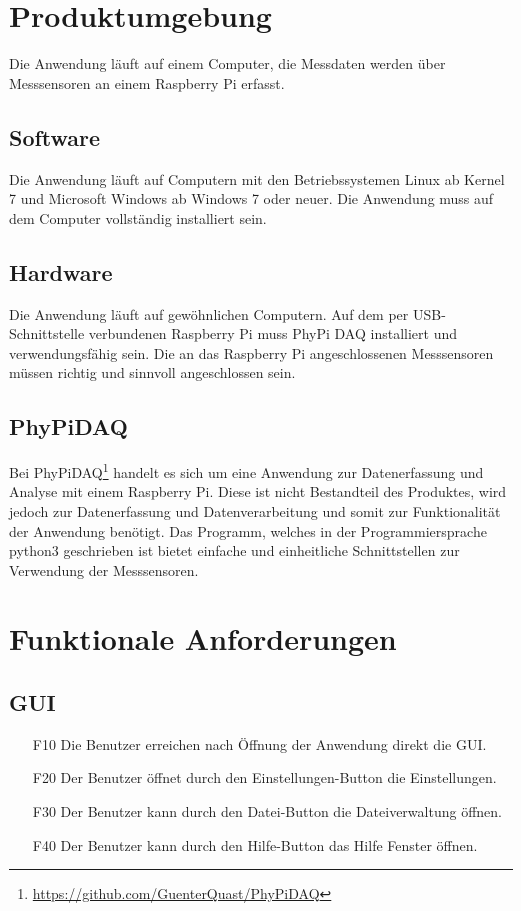 \documentclass[parskip=full]{scrartcl}
\begin{document}
\section{Produktumgebung}

Die Anwendung läuft auf einem Computer, die Messdaten werden über Messsensoren an einem Raspberry Pi erfasst.

\subsection{Software}

Die Anwendung läuft auf Computern mit den Betriebssystemen Linux ab Kernel 7 und Microsoft Windows ab Windows 7 oder neuer. Die Anwendung muss auf dem Computer vollständig installiert sein. 

\subsection{Hardware}

Die Anwendung läuft auf gewöhnlichen Computern.
Auf dem per USB-Schnittstelle verbundenen Raspberry Pi muss PhyPi DAQ installiert und verwendungsfähig sein.
Die an das Raspberry Pi angeschlossenen Messsensoren müssen richtig und sinnvoll angeschlossen sein.

\subsection{PhyPiDAQ}

Bei PhyPiDAQ\footnote{\url{https://github.com/GuenterQuast/PhyPiDAQ}} handelt es sich um eine Anwendung zur Datenerfassung und Analyse mit einem Raspberry Pi. Diese ist nicht Bestandteil des Produktes, wird jedoch zur Datenerfassung und Datenverarbeitung und somit zur Funktionalität der Anwendung  benötigt. Das Programm, welches in der Programmiersprache python3 geschrieben ist bietet einfache und einheitliche Schnittstellen zur Verwendung der Messsensoren.

\section{Funktionale Anforderungen}

\subsection{GUI}

\begin{itemize}
\item[F10] Die Benutzer erreichen nach Öffnung der Anwendung direkt die GUI.
\item[F20] Der Benutzer öffnet durch den Einstellungen-Button die Einstellungen.
\item[F30] Der Benutzer kann durch den Datei-Button die Dateiverwaltung öffnen.
\item[F40] Der Benutzer kann durch den Hilfe-Button das Hilfe Fenster öffnen.
\end{itemize}
\end{document}
